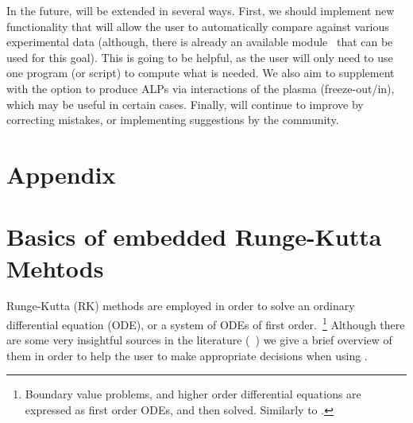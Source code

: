 \documentclass[11pt,a4paper]{article}
\renewcommand{\theequation}{\arabic{section}.\arabic{equation}}
\begin{document}
In the future, \mimes will be extended in several ways. First, we should implement new functionality that will allow the user to automatically compare against various experimental data (although, there is already an available module~\cite{2020-AxionLimits} that can be used for this goal). This is going to be helpful, as the user will only need to use one program (or script) to compute what is needed. We also aim to supplement \mimes with the option to produce ALPs via interactions of the plasma (\eg freeze-out/in), which may be useful in certain cases. Finally, \mimes will continue to improve by correcting mistakes, or implementing suggestions by the community.

\setcounter{section}{0}
\section*{Appendix}
\appendix

\renewcommand{\theequation}{\Alph{section}.\arabic{equation}}
\setcounter{equation}{0}  %

\section{Basics of embedded Runge-Kutta Mehtods}\label{app:RK}
\setcounter{equation}{0}
%
Runge-Kutta (RK) methods are employed in order to solve an ordinary differential equation (ODE), or a system of ODEs of first order.~\footnote{Boundary value problems, and higher order differential equations are expressed as first order ODEs, and then solved. Similarly to  .}   Although there are some very insightful sources in the literature (\eg~\cite{Hairer,hairer2010solving,10.5555/1403886}) we give a brief overview of them in order to help the user to make appropriate decisions when using \mimes.
\end{document}
